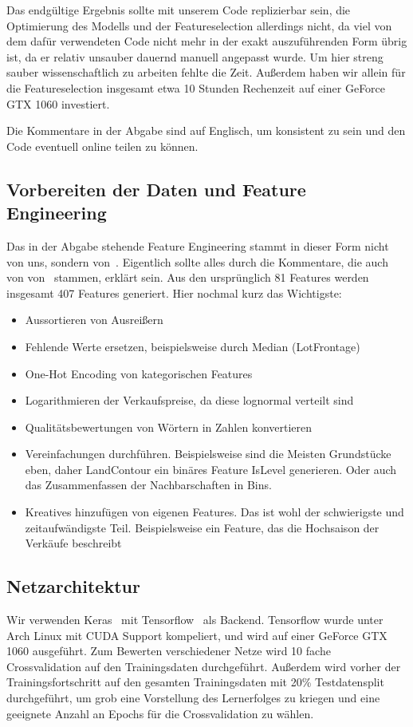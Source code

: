 \documentclass[a4paper, 11pt]{article}
\begin{document}
Das endgültige Ergebnis sollte mit unserem Code replizierbar sein, die Optimierung des Modells und der Featureselection allerdings nicht, da viel von dem dafür verwendeten Code nicht mehr in der exakt auszuführenden Form übrig ist, da er relativ unsauber dauernd manuell angepasst wurde. Um hier streng sauber wissenschaftlich zu arbeiten fehlte die Zeit. Außerdem haben wir allein für die Featureselection insgesamt etwa 10 Stunden Rechenzeit auf einer GeForce GTX 1060 investiert.

Die Kommentare in der Abgabe sind auf Englisch, um konsistent zu sein und den Code eventuell online teilen zu können.

\subsection*{Vorbereiten der Daten und Feature Engineering}
Das in der Abgabe stehende Feature Engineering stammt in dieser Form nicht von uns, sondern von~\cite{kernel}. Eigentlich sollte alles durch die Kommentare, die auch von von~\cite{kernel} stammen, erklärt sein. Aus den ursprünglich 81 Features werden insgesamt 407 Features generiert. Hier nochmal kurz das Wichtigste:
\begin{itemize}
    \item Aussortieren von Ausreißern
    \item Fehlende Werte ersetzen, beispielsweise durch Median (LotFrontage)
    \item One-Hot Encoding von kategorischen Features
    \item Logarithmieren der Verkaufspreise, da diese lognormal verteilt sind
    \item Qualitätsbewertungen von Wörtern in Zahlen konvertieren
    \item Vereinfachungen durchführen. Beispielsweise sind die Meisten Grundstücke eben, daher LandContour ein binäres Feature IsLevel generieren. Oder auch das Zusammenfassen der Nachbarschaften in Bins.
    \item Kreatives hinzufügen von eigenen Features. Das ist wohl der schwierigste und zeitaufwändigste Teil. Beispielsweise ein Feature, das die Hochsaison der Verkäufe beschreibt
\end{itemize}

\subsection*{Netzarchitektur}
Wir verwenden Keras~\cite{keras} mit Tensorflow~\cite{tf} als Backend. Tensorflow wurde unter Arch Linux mit CUDA Support kompeliert, und wird auf einer GeForce GTX 1060 ausgeführt. Zum Bewerten verschiedener Netze wird 10 fache Crossvalidation auf den Trainingsdaten durchgeführt. Außerdem wird vorher der Trainingsfortschritt auf den gesamten Trainingsdaten mit 20\% Testdatensplit durchgeführt, um grob eine Vorstellung des Lernerfolges zu kriegen und eine geeignete Anzahl an Epochs für die Crossvalidation zu wählen.
\end{document}
